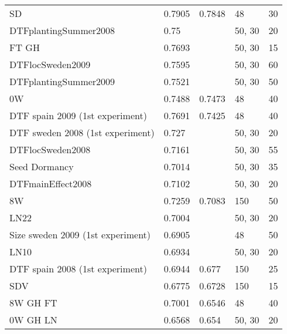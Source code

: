 \begin{longtable}{p{} p{} p{} p{} p{}}
  SD                                 & 0.7905  & 0.7848               & 48           & 30     \\
  DTFplantingSummer2008              & 0.75    & \color{red}{0.7746}  & 50, 30       & 20     \\
  FT GH                              & 0.7693  & \color{red}{0.7702}  & 50, 30       & 15     \\
  DTFlocSweden2009                   & 0.7595  & \color{red}{0.7626}  & 50, 30       & 60     \\
  DTFplantingSummer2009              & 0.7521  & \color{red}{0.7584}  & 50, 30       & 50     \\
  0W                                 & 0.7488  & 0.7473               & 48           & 40     \\
  DTF spain 2009 (1st experiment)    & 0.7691  & 0.7425               & 48           & 40     \\
  DTF sweden 2008 (1st experiment)   & 0.727   & \color{red}{0.728}   & 50, 30       & 20     \\
  DTFlocSweden2008                   & 0.7161  & \color{red}{0.7271}  & 50, 30       & 55     \\
  Seed Dormancy                      & 0.7014  & \color{red}{0.7241}  & 50, 30       & 35     \\
  DTFmainEffect2008                  & 0.7102  & \color{red}{0.7142}  & 50, 30       & 20     \\
  8W                                 & 0.7259  & 0.7083               & 150          & 50     \\
  LN22                               & 0.7004  & \color{red}{0.7069}  & 50, 30       & 20     \\
  Size sweden 2009 (1st experiment)  & 0.6905  & \color{red}{0.6994}  & 48           & 50     \\
  LN10                               & 0.6934  & \color{red}{0.698}   & 50, 30       & 20     \\
  DTF spain 2008 (1st experiment)    & 0.6944  & 0.677                & 150          & 25     \\
  SDV                                & 0.6775  & 0.6728               & 150          & 15     \\
  8W GH FT                           & 0.7001  & 0.6546               & 48           & 40     \\
  0W GH LN                           & 0.6568  & 0.654                & 50, 30       & 20     \\

\end{longtable}
